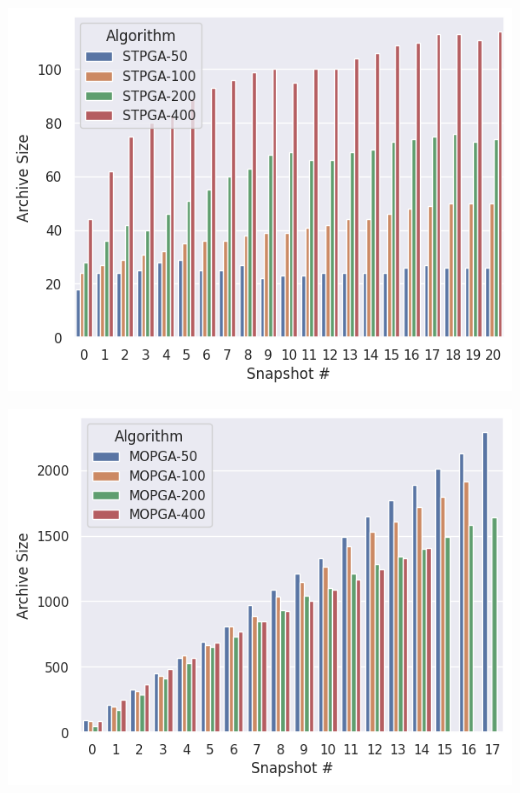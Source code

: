 \begin{minipage}{\textwidth}
\vspace{0.25cm}
  \begin{minipage}[b]{0.49\textwidth}
    \centering
    \includegraphics[scale=0.4]{img/rq1-3/rq1-3-archive2.png}
    \label{fig:rq1-3archive1}
  \end{minipage}
  \hfill
  \begin{minipage}[b]{0.49\textwidth}
    \centering
    \includegraphics[scale=0.4]{img/rq1-3/rq1-3-archive.png}
    \label{fig:rq1-3archive2}
\end{minipage}
\vspace{0.25cm}
\end{minipage}

